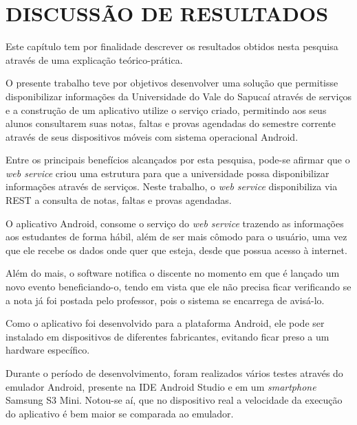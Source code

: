 
\chapter{DISCUSSÃO DE RESULTADOS} 

	\par Este capítulo tem por finalidade descrever os resultados obtidos nesta
pesquisa através de uma explicação teórico-prática.

	\par O presente trabalho teve por objetivos desenvolver uma solução que
permitisse disponibilizar informações da Universidade do Vale do Sapucaí
através de serviços e a construção de um aplicativo utilize o serviço criado,
permitindo aos seus alunos consultarem suas notas, faltas e provas agendadas do
semestre corrente através de seus dispositivos móveis com sistema operacional
Android.

	\par Entre os principais benefícios alcançados por esta pesquisa, pode-se
afirmar que o \textit{web service} criou uma estrutura para que a universidade
possa disponibilizar informações através de serviços. Neste trabalho, o
\textit{web service} disponibiliza via REST a consulta de notas, faltas e
provas agendadas.

	\par O aplicativo Android, consome o serviço do \textit{web service} trazendo
as informações aos estudantes de forma hábil, além de ser mais cômodo para o
usuário, uma vez que ele recebe os dados onde quer que esteja, desde que possua
acesso à internet.

	\par Além do mais, o software notifica o discente no momento em que é lançado
um novo evento beneficiando-o, tendo em vista que ele não precisa ficar
verificando se a nota já foi postada pelo professor, pois o sistema se
encarrega de avisá-lo.

	\par Como o aplicativo foi desenvolvido para a plataforma Android, ele pode ser
instalado em dispositivos de diferentes fabricantes, evitando ficar preso a um
hardware específico.

	\par Durante o período de desenvolvimento, foram realizados vários testes
através do emulador Android, presente na IDE Android Studio e em um
\textit{smartphone} Samsung S{3} Mini. Notou-se aí, que no dispositivo real a
velocidade da execução do aplicativo é bem maior se comparada ao emulador.

